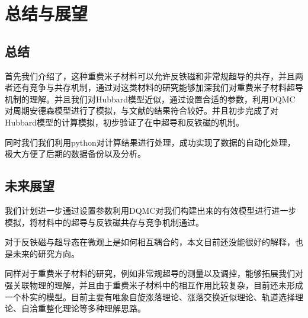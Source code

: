 
\section{总结与展望}
\subsection{总结}
首先我们介绍了，这种重费米子材料可以允许反铁磁和非常规超导的共存，并且两者还有竞争与共存机制，通过对这类材料的研究能够加深我们对重费米子材料超导机制的理解。并且我们对Hubbard模型近似，通过设置合适的参数，利用DQMC对周期安德森模型进行了模拟，与文献的结果符合较好。并且初步完成了对Hubbard模型的计算模拟，初步验证了在中超导和反铁磁的机制。

同时我们我们利用python对计算结果进行处理，成功实现了数据的自动化处理，极大方便了后期的数据备份以及分析。

\subsection{未来展望}
我们计划进一步通过设置参数利用DQMC对我们构建出来的有效模型进行进一步模拟，将材料中的超导与反铁磁共存与竞争机制通过。

对于反铁磁与超导态在微观上是如何相互耦合的，本文目前还没能很好的解释，也是未来的研究方向。

同样对于重费米子材料的研究，例如非常规超导的测量以及调控，能够拓展我们对强关联物理的理解，并且由于重费米子材料中的相互作用比较复杂，目前还未形成一个朴实的模型。目前主要有唯象自旋涨落理论、涨落交换近似理论、轨道选择理论、自洽重整化理论等多种理解思路。
